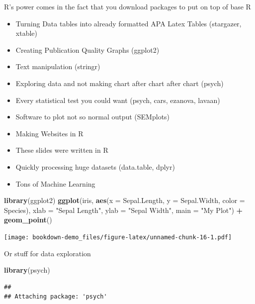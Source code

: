 \documentclass[]{book}
\newenvironment{Shaded}{\begin{snugshade}}{\end{snugshade}}
\newcommand{\KeywordTok}[1]{\textcolor[rgb]{0.13,0.29,0.53}{\textbf{#1}}}
\newcommand{\DataTypeTok}[1]{\textcolor[rgb]{0.13,0.29,0.53}{#1}}
\newcommand{\StringTok}[1]{\textcolor[rgb]{0.31,0.60,0.02}{#1}}
\newcommand{\OperatorTok}[1]{\textcolor[rgb]{0.81,0.36,0.00}{\textbf{#1}}}
\newcommand{\NormalTok}[1]{#1}
\providecommand{\tightlist}{%
  \setlength{\itemsep}{0pt}\setlength{\parskip}{0pt}}
\theoremstyle{definition}
\theoremstyle{definition}
\theoremstyle{definition}
\theoremstyle{remark}
\begin{document}
R's power comes in the fact that you download packages to put on top of
base R

\begin{itemize}
\tightlist
\item
  Turning Data tables into already formatted APA Latex Tables
  (stargazer, xtable)
\item
  Creating Publication Quality Graphs (ggplot2)
\item
  Text manipulation (stringr)
\item
  Exploring data and not making chart after chart after chart (psych)
\item
  Every statistical test you could want (psych, cars, ezanova, lavaan)
\item
  Software to plot not so normal output (SEMplots)
\item
  Making Websites in R
\item
  These slides were written in R
\item
  Quickly processing huge datasets (data.table, dplyr)
\item
  Tons of Machine Learning
\end{itemize}

\begin{Shaded}
\begin{Highlighting}[]
\KeywordTok{library}\NormalTok{(ggplot2)}
\KeywordTok{ggplot}\NormalTok{(iris, }\KeywordTok{aes}\NormalTok{(}\DataTypeTok{x =}\NormalTok{ Sepal.Length, }\DataTypeTok{y =}\NormalTok{ Sepal.Width, }
                 \DataTypeTok{color =}\NormalTok{ Species), }
       \DataTypeTok{xlab =} \StringTok{"Sepal Length"}\NormalTok{,}
       \DataTypeTok{ylab =} \StringTok{"Sepal Width"}\NormalTok{,}
       \DataTypeTok{main =} \StringTok{"My Plot"}\NormalTok{) }\OperatorTok{+}\StringTok{ }\KeywordTok{geom_point}\NormalTok{()}
\end{Highlighting}
\end{Shaded}

\texttt{[image: bookdown-demo\_files/figure-latex/unnamed-chunk-16-1.pdf]}

Or stuff for data exploration

\begin{Shaded}
\begin{Highlighting}[]
\KeywordTok{library}\NormalTok{(psych)}
\end{Highlighting}
\end{Shaded}

\begin{verbatim}
## 
## Attaching package: 'psych'
\end{verbatim}
\end{document}
